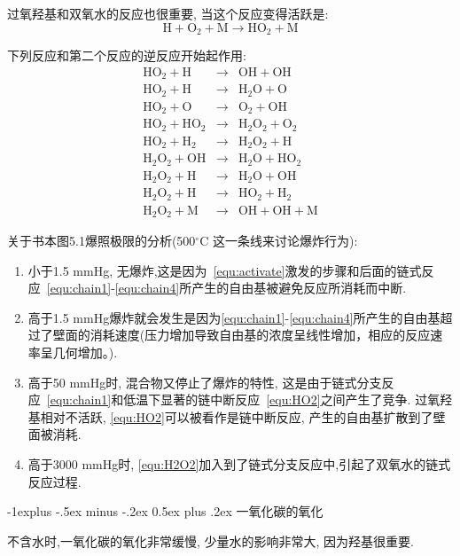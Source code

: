 \documentclass[10pt, landscape]{extarticle}
\makeatletter
\numberwithin{equation}{section}
\renewcommand{\subsection}{\@startsection{subsection}{2}{0mm}%
                                {-1explus -.5ex minus -.2ex}%
                                {0.5ex plus .2ex}%
                                {\normalfont\normalsize\bfseries}}
\makeatother
\begin{document}
\begin{multicols}{3}
\begin{multicols}{2}
{过氧羟基和双氧水的反应也很重要, 当这个反应变得活跃是:
\begin{equation}\label{equ:HO2}
    \mathrm{H+O_2+M}\to \mathrm{HO_2 +M}
\end{equation}

下列反应和第二个反应的逆反应开始起作用:
\begin{eqnarray}
    \mathrm{HO_2+H} &\to& \mathrm{OH+OH} \\
    \mathrm{HO_2+H} &\to& \mathrm{H_2O+O} \\
    \mathrm{HO_2+O} &\to& \mathrm{O_2+OH} \\
    \mathrm{HO_2+HO_2} &\to& \mathrm{H_2O_2+O_2} \\
    \mathrm{HO_2+H_2} &\to& \mathrm{H_2O_2+H} \label{equ:H2O2}\\
    \mathrm{H_2O_2+OH} &\to& \mathrm{H_2O+HO_2} \\
    \mathrm{H_2O_2+H} &\to& \mathrm{H_2O+OH} \\
    \mathrm{H_2O_2+H} &\to& \mathrm{HO_2+H_2} \\
    \mathrm{H_2O_2+M} &\to& \mathrm{OH+OH+M}
\end{eqnarray}
}
\end{multicols}
关于书本图5.1爆照极限的分析(500$^\circ$C 这一条线来讨论爆炸行为):
\begin{enumerate}
    \item 小于1.5 mmHg, 无爆炸,这是因为~\ref{equ:activate}激发的步骤和后面的链式反应~\ref{equ:chain1}-\ref{equ:chain4}所产生的自由基被避免反应所消耗而中断.
    \item 高于1.5 mmHg爆炸就会发生是因为\ref{equ:chain1}-\ref{equ:chain4}所产生的自由基超过了壁面的消耗速度(压力增加导致自由基的浓度呈线性增加，相应的反应速率呈几何增加。).
    \item 高于50 mmHg时, 混合物又停止了爆炸的特性, 这是由于链式分支反应~\ref{equ:chain1}和低温下显著的链中断反应~\ref{equ:HO2}之间产生了竞争. 过氧羟基相对不活跃, \ref{equ:HO2}可以被看作是链中断反应, 产生的自由基扩散到了壁面被消耗.
    \item 高于3000 mmHg时, \ref{equ:H2O2}加入到了链式分支反应中,引起了双氧水的链式反应过程.
\end{enumerate}

\subsection{一氧化碳的氧化}

不含水时,一氧化碳的氧化非常缓慢, 少量水的影响非常大, 因为羟基很重要.


\end{multicols}
\end{document}
